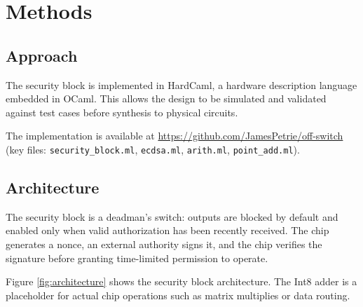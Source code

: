 \documentclass[11pt]{article}
\begin{document}
\section{Methods}

\subsection{Approach}

The security block is implemented in HardCaml, a hardware description language embedded in OCaml. This allows the design to be simulated and validated against test cases before synthesis to physical circuits.

The implementation is available at \url{https://github.com/JamesPetrie/off-switch} (key files: \texttt{security\_block.ml}, \texttt{ecdsa.ml}, \texttt{arith.ml}, \texttt{point\_add.ml}).

\subsection{Architecture}

The security block is a deadman's switch: outputs are blocked by default and enabled only when valid authorization has been recently received. The chip generates a nonce, an external authority signs it, and the chip verifies the signature before granting time-limited permission to operate.

Figure \ref{fig:architecture} shows the security block architecture. The Int8 adder is a placeholder for actual chip operations such as matrix multiplies or data routing.
\end{document}
